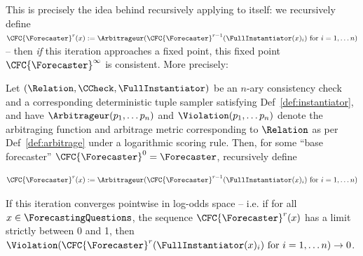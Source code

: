 This is precisely the idea behind recursively applying \CFCaster{} to itself: we recursively define $\CFC{\Forecaster}^r(x):=\Arbitrageur(\CFC{\Forecaster}^{r-1}(\FullInstantiator(x)_i)\text{ for }i=1,\dots n)$ -- then \emph{if} this iteration approaches a fixed point, this fixed point $\CFC{\Forecaster}^\infty$ is consistent. More precisely:

\begin{theorem}
\label{thm:recursive}
Let $\checktriple$ be an $n$-ary consistency check and a corresponding deterministic tuple sampler satisfying Def~\ref{def:instantiator}, and have $\Arbitrageur(p_1,\dots p_n)$ and $\Violation(p_1,\dots p_n)$ denote the arbitraging function and arbitrage metric corresponding to $\Relation$ as per Def~\ref{def:arbitrage} under a logarithmic scoring rule. Then, for some ``base forecaster'' $\CFC{\Forecaster}^0=\Forecaster$, recursively define

\begin{equation*}
\CFC{\Forecaster}^r(x):=\Arbitrageur(\CFC{\Forecaster}^{r-1}(\FullInstantiator(x)_i)\text{ for }i=1,\dots n)
\end{equation*}

If this iteration converges pointwise in log-odds space -- i.e. if for all $x\in\ForecastingQuestions$, the sequence $\CFC{\Forecaster}^r(x)$ has a limit strictly between 0 and 1, then $\Violation(\CFC{\Forecaster}^r(\FullInstantiator(x)_i)\text{ for }i=1,\dots n)\to 0$.
\end{theorem}
